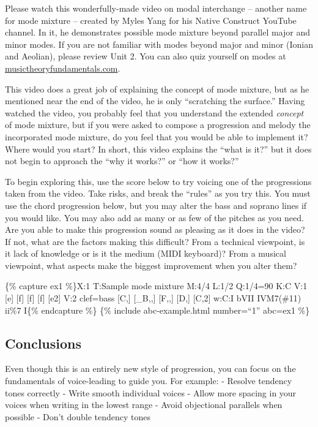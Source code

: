 \documentclass{book}
\begin{document}
Please watch this wonderfully-made video on modal interchange -- another name
for mode mixture -- created by Myles Yang for his Native Construct YouTube
channel. In it, he demonstrates possible mode mixture beyond parallel major
and minor modes. If you are not familiar with modes beyond major and minor
(Ionian and Aeolian), please review Unit 2. You can also quiz yourself on
modes at
\href{http://musictheoryfundamentals.com/MusicTheory/modes.php}{musictheoryfundamentals.com}.

This video does a great job of explaining the concept of mode mixture, but as
he mentioned near the end of the video, he is only ``scratching the surface.''
Having watched the video, you probably feel that you understand the extended
\emph{concept} of mode mixture, but if you were asked to compose a progression
and melody the incorporated mode mixture, do you feel that you would be able
to implement it? Where would you start? In short, this video explains the
``what is it?'' but it does not begin to approach the ``why it works?'' or
``how it works?''

To begin exploring this, use the score below to try voicing one of the
progressions taken from the video. Take risks, and break the ``rules'' as you
try this. You must use the chord progression below, but you may alter the bass
and soprano lines if you would like. You may also add as many or as few of the
pitches as you need. Are you able to make this progression sound as pleasing
as it does in the video? If not, what are the factors making this difficult?
From a technical viewpoint, is it lack of knowledge or is it the medium (MIDI
keyboard)? From a musical viewpoint, what aspects make the biggest improvement
when you alter them?

\{\% capture ex1 \%\}X:1 T:Sample mode mixture M:4/4 L:1/2 Q:1/4=90 K:C V:1
{[}e{]} {[}f{]}\textbar{} {[}f{]} {[}f{]}\textbar{} {[}e2{]}\textbar{]} V:2
clef=bass {[}C,{]} {[}\_B,,{]}\textbar{} {[}F,,{]} {[}D,{]}\textbar{}
{[}C,2{]}\textbar{]} w:C:I bVII IVM7(\#11) ii\%7 I\{\% endcapture \%\} \{\%
include abc-example.html number=``1'' abc=ex1 \%\}

\hypertarget{conclusions-50}{%
\subsection{Conclusions}\label{conclusions-50}}

Even though this is an entirely new style of progression, you can focus on the
fundamentals of voice-leading to guide you. For example: - Resolve tendency
tones correctly - Write smooth individual voices - Allow more spacing in your
voices when writing in the lowest range - Avoid objectional parallels when
possible - Don't double tendency tones
\end{document}
